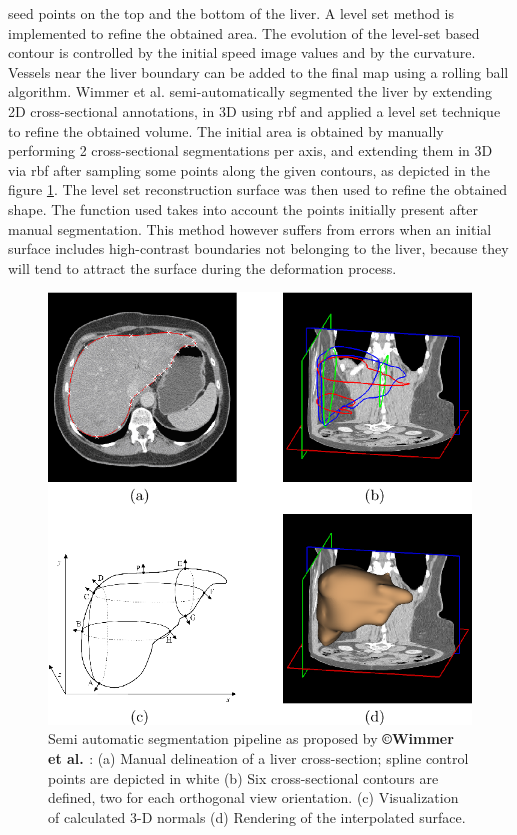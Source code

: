 seed points on the top and the bottom of the liver. A level set method
is implemented to refine the obtained area. The evolution of the
level-set based contour is controlled by the initial speed image values
and by the curvature. Vessels near the liver boundary can be added to
the final map using a rolling ball algorithm.
Wimmer et al. \cite{Wimmer2007} semi-automatically segmented the liver by extending 2D
cross-sectional annotations, in 3D using \ac{rbf} and applied a level set
technique to refine the obtained volume. The initial area is obtained by
manually performing 2 cross-sectional segmentations per axis, and
extending them in 3D via \ac{rbf} after sampling some points along the given
contours, as depicted in the figure \ref{Wimmer2007_Fig2}.
The level set reconstruction surface was then used to refine the
obtained shape. The function used takes into account the points
initially present after manual segmentation. This method however suffers
from errors when an initial surface includes high-contrast boundaries
not belonging to the liver, because they will tend to attract the
surface during the deformation process.


\begin{figure} [ht!]
	\centering
	\includegraphics[width=0.5\linewidth]{images/Wimmer2007_Fig2}
	\caption{Semi automatic segmentation pipeline as proposed by \textbf{©Wimmer et al. \cite{Wimmer2007}}: (a) Manual delineation of a liver cross-section; spline control points are depicted in white (b) Six cross-sectional contours are defined, two for each orthogonal view orientation. (c) Visualization of calculated 3-D normals (d) Rendering of the interpolated surface.}
	\label{Wimmer2007_Fig2}
\end{figure}


